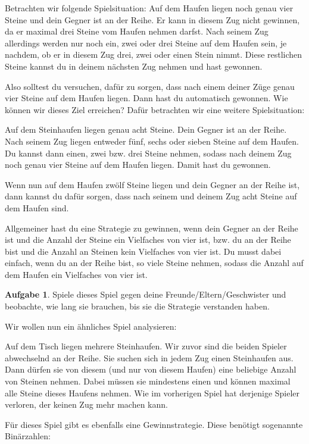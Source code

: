 \documentclass[a4paper,ngerman,12pt]{scrartcl}
\theoremstyle{definition}
\newtheorem*{aufg}{Aufgabe}
\begin{document}
Betrachten wir folgende Spielsituation: Auf dem Haufen liegen noch genau vier Steine und dein Gegner ist an der Reihe. Er kann in diesem Zug nicht gewinnen, da er maximal drei Steine vom Haufen nehmen darfst. Nach seinem Zug allerdings werden nur noch ein, zwei oder drei Steine auf dem Haufen sein, je nachdem, ob er in diesem Zug drei, zwei oder einen Stein nimmt. Diese restlichen Steine kannst du in deinem nächsten Zug nehmen und hast gewonnen.

Also solltest du versuchen, dafür zu sorgen, dass nach einem deiner Züge genau vier Steine auf dem Haufen liegen. Dann hast du automatisch gewonnen. Wie können wir dieses Ziel erreichen? Dafür betrachten wir eine weitere Spielsituation:

Auf dem Steinhaufen liegen genau acht Steine. Dein Gegner ist an der Reihe. Nach seinem Zug liegen entweder fünf, sechs oder sieben Steine auf dem Haufen. Du kannst dann einen, zwei bzw. drei Steine nehmen, sodass nach deinem Zug noch genau vier Steine auf dem Haufen liegen. Damit hast du gewonnen.

Wenn nun auf dem Haufen zwölf Steine liegen und dein Gegner an der Reihe ist, dann kannst du dafür sorgen, dass nach seinem und deinem Zug acht Steine auf dem Haufen sind.

Allgemeiner hast du eine Strategie zu gewinnen, wenn dein Gegner an der Reihe ist und die Anzahl der Steine ein Vielfaches von vier ist, bzw. du an der Reihe bist und die Anzahl an Steinen kein Vielfaches von vier ist. Du musst dabei einfach, wenn du an der Reihe bist, so viele Steine nehmen, sodass die Anzahl auf dem Haufen ein Vielfaches von vier ist.

\begin{aufg}
  Spiele dieses Spiel gegen deine Freunde/Eltern/Geschwister und beobachte, wie lang sie brauchen, bis sie die Strategie verstanden haben.
\end{aufg}

Wir wollen nun ein ähnliches Spiel analysieren:

Auf dem Tisch liegen mehrere Steinhaufen. Wir zuvor sind die beiden Spieler abwechselnd an der Reihe. Sie suchen sich in jedem Zug einen Steinhaufen aus. Dann dürfen sie von diesem (und nur von diesem Haufen) eine beliebige Anzahl von Steinen nehmen. Dabei müssen sie mindestens einen und können maximal alle Steine dieses Haufens nehmen. Wie im vorherigen Spiel hat derjenige Spieler verloren, der keinen Zug mehr machen kann.

Für dieses Spiel gibt es ebenfalls eine Gewinnstrategie. Diese benötigt sogenannte Binärzahlen:
\end{document}
